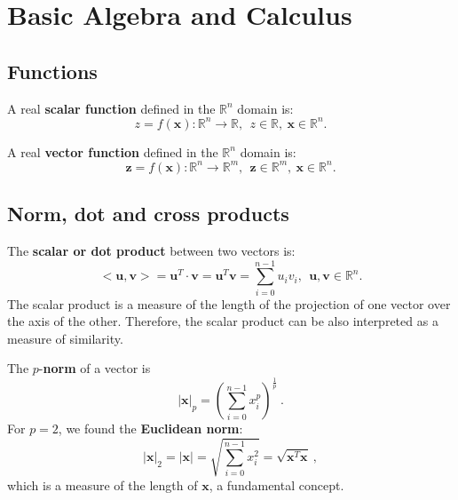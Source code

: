 
\section{Basic Algebra and Calculus}

\subsection{Functions}

A real \textbf{scalar function} defined in the $\mathbb{R}^n$ domain is:
\begin{equation}
 z=f(\mathbf{x}):\mathbb{R}^n \rightarrow \mathbb{R}, 
 \ \ z \in \mathbb{R}, \ \mathbf{x} \in \mathbb{R}^n.
\end{equation}

A real \textbf{vector function} defined in the $\mathbb{R}^n$ domain is:
\begin{equation}
 \mathbf{z}=f(\mathbf{x}):\mathbb{R}^n \rightarrow \mathbb{R}^m, 
 \ \ \mathbf{z} \in \mathbb{R}^m, \ \mathbf{x} \in \mathbb{R}^n.
\end{equation}

\subsection{Norm, dot and cross products }
\label{subsec:norm_dot_cross}

The \textbf{scalar or dot product} between two vectors is:
\begin{equation}
<\mathbf{u},\mathbf{v}> = \mathbf{u}^T \cdot \mathbf{v} = \mathbf{u}^T \mathbf{v} = \sum_{i=0}^{n-1} u_{i} v_{i}
, \ \ \mathbf{u},\mathbf{v} \in \mathbb{R}^n.
\end{equation}
The scalar product is a measure of the length of the projection of one vector over the axis of the other. 
Therefore, the scalar product can be also interpreted as a measure of similarity.

The $p$-\textbf{norm} of a vector is 
\begin{equation}
 \vert \mathbf{x} \vert _p = ( \sum_{i=0}^{n-1} x_{i}^p )^{\frac{1}{p}} \ .
\end{equation}
For $p = 2$, we found the \textbf{Euclidean norm}:
\begin{equation}
 \vert \mathbf{x} \vert _2 = \vert \mathbf{x} \vert = \sqrt{\sum_{i=0}^{n-1} x_{i}^2} = \sqrt{\mathbf{x}^T \mathbf{x}}\ ,
\end{equation}
which is a measure of the length of $\mathbf{x}$, a fundamental concept.

